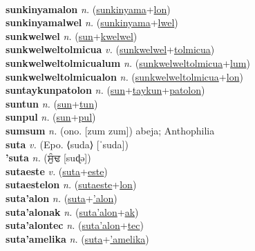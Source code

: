  \label{sunkinyamales} \\
\textbf{sunkinyamalon} \textit{n.} (\hyperref[sunkinyama]{sunkinyama}+\hyperref[lon]{lon})
 \label{sunkinyamalon} \\
\textbf{sunkinyamalwel} \textit{n.} (\hyperref[sunkinyama]{sunkinyama}+\hyperref[lwel]{lwel})
 \label{sunkinyamalwel} \\
\textbf{sunkwelwel} \textit{n.} (\hyperref[sun]{sun}+\hyperref[kwelwel]{kwelwel})
 \label{sunkwelwel} \\
\textbf{sunkwelweltolmicua} \textit{v.} (\hyperref[sunkwelwel]{sunkwelwel}+\hyperref[tolmicua]{tolmicua})
 \label{sunkwelweltolmicua} \\
\textbf{sunkwelweltolmicualum} \textit{n.} (\hyperref[sunkwelweltolmicua]{sunkwelweltolmicua}+\hyperref[lum]{lum})
 \label{sunkwelweltolmicualum} \\
\textbf{sunkwelweltolmicualon} \textit{n.} (\hyperref[sunkwelweltolmicua]{sunkwelweltolmicua}+\hyperref[lon]{lon})
 \label{sunkwelweltolmicualon} \\
\textbf{suntaykunpatolon} \textit{n.} (\hyperref[sun]{sun}+\hyperref[taykun]{taykun}+\hyperref[patolon]{patolon})
 \label{suntaykunpatolon} \\
\textbf{suntun} \textit{n.} (\hyperref[sun]{sun}+\hyperref[tun]{tun})
 \label{suntun} \\
\textbf{sunpul} \textit{n.} (\hyperref[sun]{sun}+\hyperref[pul]{pul})
 \label{sunpul} \\
\textbf{sumsum} \textit{n.} (ono. [zum zum])
abeja; Anthophilia \label{sumsum} \\
\textbf{suta} \textit{v.} (Epo. ⟨suda⟩ [ˈsuda])
 \label{suta} \\
\textbf{'suta} \textit{n.} ({\gurmukhi{}ਸੁੰਢ} [suɖə])
 \label{'suta} \\
\textbf{sutaeste} \textit{v.} (\hyperref[suta]{suta}+\hyperref[este]{este})
 \label{sutaeste} \\
\textbf{sutaestelon} \textit{n.} (\hyperref[sutaeste]{sutaeste}+\hyperref[lon]{lon})
 \label{sutaestelon} \\
\textbf{suta'alon} \textit{n.} (\hyperref[suta]{suta}+\hyperref['alon]{'alon})
 \label{suta'alon} \\
\textbf{suta'alonak} \textit{n.} (\hyperref[suta'alon]{suta'alon}+\hyperref[ak]{ak})
 \label{suta'alonak} \\
\textbf{suta'alontec} \textit{n.} (\hyperref[suta'alon]{suta'alon}+\hyperref[tec]{tec})
 \label{suta'alontec} \\
\textbf{suta'amelika} \textit{n.} (\hyperref[suta]{suta}+\hyperref['amelika]{'amelika})
